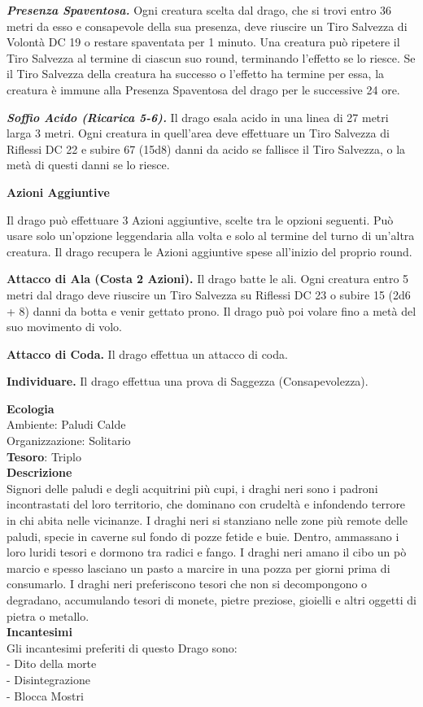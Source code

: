 \begin{multicols}{2}
\textit{\textbf{Presenza Spaventosa.}} Ogni creatura scelta dal drago, che si trovi entro 36 metri da esso e consapevole della sua presenza, deve riuscire un Tiro Salvezza di Volontà DC 19 o restare spaventata per 1 minuto. Una creatura può ripetere il Tiro Salvezza al termine di ciascun suo round, terminando l'effetto se lo riesce. Se il Tiro Salvezza della creatura ha successo o l'effetto ha termine per essa, la creatura è immune alla Presenza Spaventosa del drago per le successive 24 ore.

\textit{\textbf{Soffio Acido (Ricarica 5-6).}} Il drago esala acido in una linea di 27 metri larga 3 metri. Ogni creatura in quell'area deve effettuare un Tiro Salvezza di Riflessi DC 22 e subire 67 (15d8) danni da acido se fallisce il Tiro Salvezza, o la metà di questi danni se lo riesce.

\textbf{Azioni Aggiuntive}

Il drago può effettuare 3 Azioni aggiuntive, scelte tra le opzioni seguenti. Può usare solo un'opzione leggendaria alla volta e solo al termine del turno di un'altra creatura. Il drago recupera le Azioni aggiuntive spese all'inizio del proprio round.

\textbf{Attacco di Ala (Costa 2 Azioni).} Il drago batte le ali. Ogni creatura entro 5 metri dal drago deve riuscire un Tiro Salvezza su Riflessi DC 23 o subire 15 (2d6 + 8) danni da botta e venir gettato prono. Il drago può poi volare fino a metà del suo movimento di volo.

\textbf{Attacco di Coda.} Il drago effettua un attacco di coda.

\textbf{Individuare.} Il drago effettua una prova di Saggezza (Consapevolezza).

\textbf{Ecologia}\\
Ambiente: Paludi Calde\\
Organizzazione: Solitario\\
\textbf{Tesoro}: Triplo\\
\textbf{Descrizione}\\
Signori delle paludi e degli acquitrini più cupi, i draghi neri sono i padroni incontrastati del loro territorio, che dominano con crudeltà e infondendo terrore in chi abita nelle vicinanze. I draghi neri si stanziano nelle zone più remote delle paludi, specie in caverne sul fondo di pozze fetide e buie. Dentro, ammassano i loro luridi tesori e dormono tra radici e fango. I draghi neri amano il cibo un pò marcio e spesso lasciano un pasto a marcire in una pozza per giorni prima di consumarlo. I draghi neri preferiscono tesori che non si decompongono o degradano, accumulando tesori di monete, pietre preziose, gioielli e altri oggetti di pietra o metallo.\\
\textbf{Incantesimi}\\
Gli incantesimi preferiti di questo Drago sono:\\
- Dito della morte\\
- Disintegrazione\\
- Blocca Mostri



\end{multicols}
